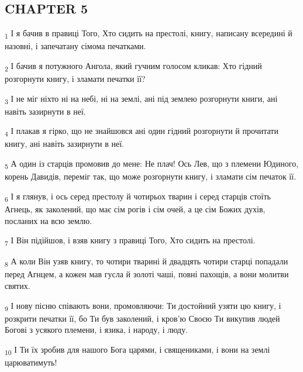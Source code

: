 \subsection{CHAPTER 5}
\begin{tcolorbox}
\textsubscript{1} І я бачив в правиці Того, Хто сидить на престолі, книгу, написану всередині й назовні, і запечатану сімома печатками.
\end{tcolorbox}
\begin{tcolorbox}
\textsubscript{2} І бачив я потужного Ангола, який гучним голосом кликав: Хто гідний розгорнути книгу, і зламати печатки її?
\end{tcolorbox}
\begin{tcolorbox}
\textsubscript{3} І не міг ніхто ні на небі, ні на землі, ані під землею розгорнути книги, ані навіть зазирнути в неї.
\end{tcolorbox}
\begin{tcolorbox}
\textsubscript{4} І плакав я гірко, що не знайшовся ані один гідний розгорнути й прочитати книгу, ані навіть зазирнути в неї.
\end{tcolorbox}
\begin{tcolorbox}
\textsubscript{5} А один із старців промовив до мене: Не плач! Ось Лев, що з племени Юдиного, корень Давидів, переміг так, що може розгорнути книгу, і зламати сім печаток її.
\end{tcolorbox}
\begin{tcolorbox}
\textsubscript{6} І я глянув, і ось серед престолу й чотирьох тварин і серед старців стоїть Агнець, як заколений, що має сім рогів і сім очей, а це сім Божих духів, посланих на всю землю.
\end{tcolorbox}
\begin{tcolorbox}
\textsubscript{7} І Він підійшов, і взяв книгу з правиці Того, Хто сидить на престолі.
\end{tcolorbox}
\begin{tcolorbox}
\textsubscript{8} А коли Він узяв книгу, то чотири тварині й двадцять чотири старці попадали перед Агнцем, а кожен мав гусла й золоті чаші, повні пахощів, а вони молитви святих.
\end{tcolorbox}
\begin{tcolorbox}
\textsubscript{9} І нову пісню співають вони, промовляючи: Ти достойний узяти цю книгу, і розкрити печатки її, бо Ти був заколений, і кров'ю Своєю Ти викупив людей Богові з усякого племени, і язика, і народу, і люду.
\end{tcolorbox}
\begin{tcolorbox}
\textsubscript{10} І Ти їх зробив для нашого Бога царями, і священиками, і вони на землі царюватимуть!
\end{tcolorbox}
